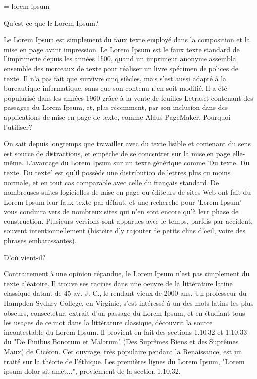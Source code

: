 \output={\plainoutput\blankpageoutput}
\def\blankpageoutput{\shipout\vbox{\makeheadline
\vbox to\vsize{}\makefootline}\advancepageno}
lorem ipsum

Qu'est-ce que le Lorem Ipsum?

Le Lorem Ipsum est simplement du faux texte employé dans la composition et la mise en page avant impression. Le Lorem Ipsum est le faux texte standard de l'imprimerie depuis les années 1500, quand un imprimeur anonyme assembla ensemble des morceaux de texte pour réaliser un livre spécimen de polices de texte. Il n'a pas fait que survivre cinq siècles, mais s'est aussi adapté à la bureautique informatique, sans que son contenu n'en soit modifié. Il a été popularisé dans les années 1960 grâce à la vente de feuilles Letraset contenant des passages du Lorem Ipsum, et, plus récemment, par son inclusion dans des applications de mise en page de texte, comme Aldus PageMaker.
Pourquoi l'utiliser?

On sait depuis longtemps que travailler avec du texte lisible et contenant du sens est source de distractions, et empêche de se concentrer sur la mise en page elle-même. L'avantage du Lorem Ipsum sur un texte générique comme 'Du texte. Du texte. Du texte.' est qu'il possède une distribution de lettres plus ou moins normale, et en tout cas comparable avec celle du français standard. De nombreuses suites logicielles de mise en page ou éditeurs de sites Web ont fait du Lorem Ipsum leur faux texte par défaut, et une recherche pour 'Lorem Ipsum' vous conduira vers de nombreux sites qui n'en sont encore qu'à leur phase de construction. Plusieurs versions sont apparues avec le temps, parfois par accident, souvent intentionnellement (histoire d'y rajouter de petits clins d'oeil, voire des phrases embarassantes).

D'où vient-il?

Contrairement à une opinion répandue, le Lorem Ipsum n'est pas simplement du texte aléatoire. Il trouve ses racines dans une oeuvre de la littérature latine classique datant de 45 av. J.-C., le rendant vieux de 2000 ans. Un professeur du Hampden-Sydney College, en Virginie, s'est intéressé à un des mots latins les plus obscurs, consectetur, extrait d'un passage du Lorem Ipsum, et en étudiant tous les usages de ce mot dans la littérature classique, découvrit la source incontestable du Lorem Ipsum. Il provient en fait des sections 1.10.32 et 1.10.33 du "De Finibus Bonorum et Malorum" (Des Suprêmes Biens et des Suprêmes Maux) de Cicéron. Cet ouvrage, très populaire pendant la Renaissance, est un traité sur la théorie de l'éthique. Les premières lignes du Lorem Ipsum, "Lorem ipsum dolor sit amet...", proviennent de la section 1.10.32.

